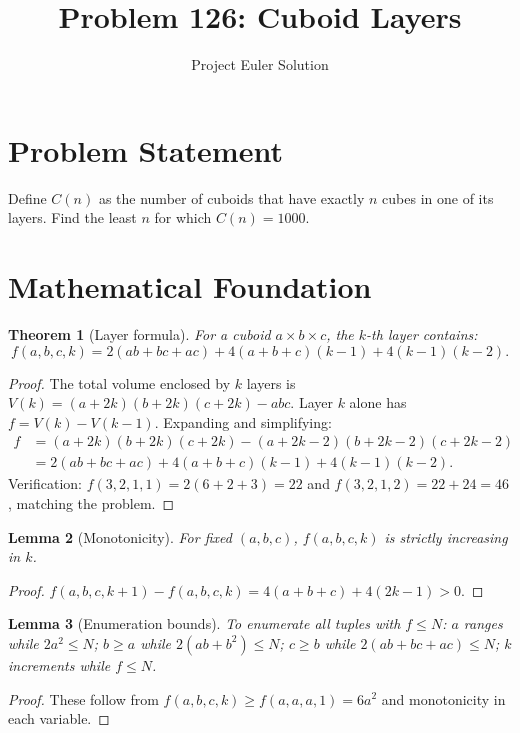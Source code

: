 \documentclass[11pt,a4paper]{article}
\title{Problem 126: Cuboid Layers}
\author{Project Euler Solution}
\date{}
\newtheorem{theorem}{Theorem}
\newtheorem{lemma}[theorem]{Lemma}
\begin{document}
\maketitle

\section{Problem Statement}

Define $C(n)$ as the number of cuboids that have exactly $n$ cubes in one of its layers. Find the least $n$ for which $C(n) = 1000$.

\section{Mathematical Foundation}

\begin{theorem}[Layer formula]
For a cuboid $a \times b \times c$, the $k$-th layer contains:
\[
f(a,b,c,k) = 2(ab + bc + ac) + 4(a+b+c)(k-1) + 4(k-1)(k-2).
\]
\end{theorem}

\begin{proof}
The total volume enclosed by $k$ layers is $V(k) = (a+2k)(b+2k)(c+2k) - abc$. Layer $k$ alone has $f = V(k) - V(k-1)$. Expanding and simplifying:
\begin{align*}
f &= (a+2k)(b+2k)(c+2k) - (a+2k-2)(b+2k-2)(c+2k-2) \\
  &= 2(ab+bc+ac) + 4(a+b+c)(k-1) + 4(k-1)(k-2).
\end{align*}
Verification: $f(3,2,1,1) = 2(6+2+3) = 22$ and $f(3,2,1,2) = 22 + 24 = 46$, matching the problem.
\end{proof}

\begin{lemma}[Monotonicity]
For fixed $(a,b,c)$, $f(a,b,c,k)$ is strictly increasing in $k$.
\end{lemma}

\begin{proof}
$f(a,b,c,k+1) - f(a,b,c,k) = 4(a+b+c) + 4(2k-1) > 0$.
\end{proof}

\begin{lemma}[Enumeration bounds]
To enumerate all tuples with $f \le N$: $a$ ranges while $2a^2 \le N$; $b \ge a$ while $2(ab+b^2) \le N$; $c \ge b$ while $2(ab+bc+ac) \le N$; $k$ increments while $f \le N$.
\end{lemma}

\begin{proof}
These follow from $f(a,b,c,k) \ge f(a,a,a,1) = 6a^2$ and monotonicity in each variable.
\end{proof}
\end{document}
